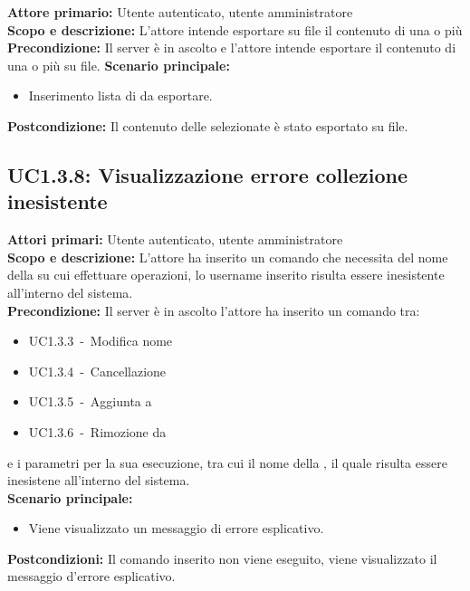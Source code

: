 \documentclass{scalatekids-article}
\begin{document}
\textbf{Attore primario:} Utente autenticato, utente amministratore\\
\textbf{Scopo e descrizione:} L'attore intende esportare su file il contenuto di una o più \\
\textbf{Precondizione:} Il server è in ascolto e l'attore intende esportare il contenuto di una o più  su file.
\textbf{Scenario principale:}
\begin{itemize}
\item Inserimento lista di  da esportare.
\end{itemize}
\textbf{Postcondizione:} Il contenuto delle  selezionate è stato esportato su file.

\subsection{UC1.3.8: Visualizzazione errore collezione inesistente}

\textbf{Attori primari:} Utente autenticato, utente amministratore\\
\textbf{Scopo e descrizione:} L'attore ha inserito un comando che necessita del nome della  su cui effettuare operazioni, lo username inserito risulta essere inesistente all'interno del sistema.\\
\textbf{Precondizione:}
Il server è in ascolto l'attore ha inserito un comando tra:
\begin{itemize}
\item UC1.3.3\ -\ Modifica nome 
\item UC1.3.4\ -\ Cancellazione 
\item UC1.3.5\ -\ Aggiunta  a 
\item UC1.3.6\ -\ Rimozione  da 
\end{itemize}
e i parametri per la sua esecuzione, tra cui il nome della , il quale risulta essere inesistene all'interno del sistema.\\
\textbf{Scenario principale:}
\begin{itemize}
\item Viene visualizzato un messaggio di errore esplicativo.
\end{itemize}
\textbf{Postcondizioni:} Il comando inserito non viene eseguito, viene visualizzato il messaggio d'errore esplicativo.
\end{document}
